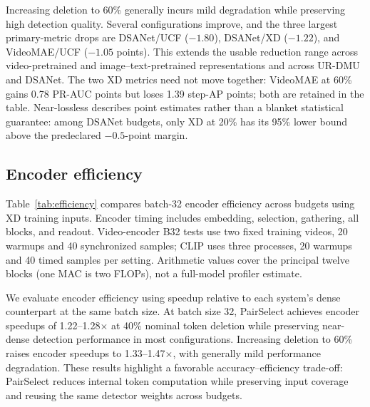 Increasing deletion to 60\% generally incurs mild degradation while preserving high detection quality. Several configurations improve, and the three largest primary-metric drops are DSANet/UCF ($-1.80$), DSANet/XD ($-1.22$), and VideoMAE/UCF ($-1.05$ points). This extends the usable reduction range across video-pretrained and image--text-pretrained representations and across UR-DMU and DSANet. The two XD metrics need not move together: VideoMAE at 60\% gains 0.78 PR-AUC points but loses 1.39 step-AP points; both are retained in the table. Near-lossless describes point estimates rather than a blanket statistical guarantee: among DSANet budgets, only XD at 20\% has its 95\% lower bound above the predeclared $-0.5$-point margin.

\subsection{Encoder efficiency}
Table~\ref{tab:efficiency} compares batch-32 encoder efficiency across budgets using XD training inputs. Encoder timing includes embedding, selection, gathering, all blocks, and readout. Video-encoder B32 tests use two fixed training videos, 20 warmups and 40 synchronized samples; CLIP uses three processes, 20 warmups and 40 timed samples per setting. Arithmetic values cover the principal twelve blocks (one MAC is two FLOPs), not a full-model profiler estimate.

We evaluate encoder efficiency using speedup relative to each system’s dense counterpart at the same batch size. At batch size 32, PairSelect achieves encoder speedups of 1.22--1.28$\times$ at 40\% nominal token deletion while preserving near-dense detection performance in most configurations. Increasing deletion to 60\% raises encoder speedups to 1.33--1.47$\times$, with generally mild performance degradation. These results highlight a favorable accuracy--efficiency trade-off: PairSelect reduces internal token computation while preserving input coverage and reusing the same detector weights across budgets.
